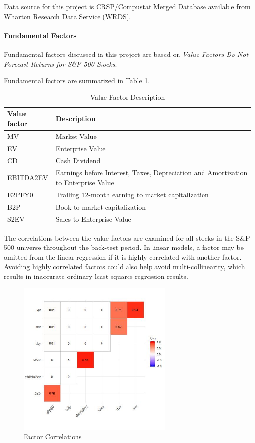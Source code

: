 \documentclass[]{article}
\let\oldparagraph\paragraph
\renewcommand{\paragraph}[1]{\oldparagraph{#1}\mbox{}}
\begin{document}
Data source for this project is CRSP/Compustat Merged Database available
from Wharton Research Data Service (WRDS).

\hypertarget{fundamental-factors}{%
\paragraph{Fundamental Factors}\label{fundamental-factors}}

Fundamental factors discussed in this project are based on \emph{Value
Factors Do Not Forecast Returns for S\&P 500 Stocks}.

Fundamental factors are summarized in Table 1.

\begin{table}[H]
\begin{center}
\caption{Value Factor Description}
\label{table1}
\centering
\begin{tabular}{l l}\hline
Value factor & Description \\ \hline
MV & Market Value\\
EV & Enterprise Value\\
CD & Cash Dividend\\
EBITDA2EV & Earnings before Interest, Taxes, Depreciation and Amortization to Enterprise Value\\
E2PFY0 & Trailing 12-month earning to market capitalization\\
B2P & Book to market capitalization\\
S2EV & Sales to Enterprise Value\\
\hline
\end{tabular}
\end{center}
\end{table}

The correlations between the value factors are examined for all stocks
in the S\&P 500 universe throughout the back-test period. In linear
models, a factor may be omitted from the linear regression if it is
highly correlated with another factor. Avoiding highly correlated
factors could also help avoid multi-collinearity, which results in
inaccurate ordinary least squares regression results.

\begin{figure}[H]
\begin{center}
\includegraphics[width=3in]{Lab//CorHeatMap.jpg}
\caption{Factor Correlations}
\label{figure1}
\end{center}
\end{figure}
\end{document}
